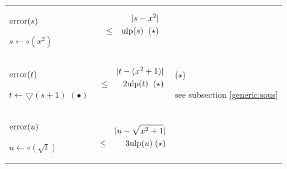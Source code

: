 \documentclass[12pt]{amsart}
\def\minf{\bigtriangledown}
\def\ulp{{\rm ulp}}
\begin{document}
\begin{center}
\begin{tabular}{l l l}

\begin{minipage}{2.5cm}
${\textnormal{error}}(s)$


$s \leftarrow \circ(x^2) $

\end{minipage} &
\begin{minipage}{7.5cm}

\begin{eqnarray}\nonumber
  &&|s-x^2| \\\nonumber
  &       \leq&  \ulp(s)\;\;(\star)\\\nonumber
\end{eqnarray}


\end{minipage} &
\begin{minipage}{6cm}

\end{minipage}\\%
\begin{minipage}{2.5cm}
${\textnormal{error}}(t)$


$t \leftarrow \minf(s+1) $
$(\bullet)$
\end{minipage} &
\begin{minipage}{7.5cm}



\begin{eqnarray}\nonumber
  &&|t-(x^2+1)| \\\nonumber
  &       \leq&  2 \ulp(t) \;\;(\star)\\\nonumber
\end{eqnarray}


\end{minipage} &
\begin{minipage}{6cm}

($\star$)

see subsection \ref{generic:sous}


\end{minipage}\\%
\begin{minipage}{2.5cm}
${\textnormal{error}}(u)$


$u \leftarrow \circ(\sqrt{t}) $


\end{minipage} &
\begin{minipage}{7.5cm}

\begin{eqnarray}\nonumber
  &&|u-\sqrt{x^2+1}| \\\nonumber
  &       \leq& 3 \ulp(u) \;(\star)
\end{eqnarray}



\end{minipage}
\end{tabular}
\end{center}
\end{document}
